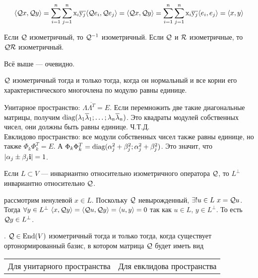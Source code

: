 \documentclass{article}
\begin{document}
\begin{itemize}
\begin{Proof}
            $$
            {\left\langle{{\mathcal{Q}}x},{{\mathcal{Q}} y}\right\rangle}=\sum\limits_{i=1}^n\sum\limits_{j=1}^n\mathrm x_i\overline{\mathrm y_j}{\left\langle{{\mathcal{Q}}e_i},{{\mathcal{Q}} e_j}\right\rangle}={\left\langle{{\mathcal{Q}}x},{{\mathcal{Q}} y}\right\rangle}=\sum\limits_{i=1}^n\sum\limits_{j=1}^n\mathrm x_i\overline{\mathrm y_j}{\left\langle{e_i},{e_j}\right\rangle}={\left\langle{x},{y}\right\rangle}
            $$
        \end{Proof}
        \thm Если ${\mathcal{Q}}$ изометричный, то ${\mathcal{Q}}^{-1}$ изометричный.
        \thm Если ${\mathcal{Q}}$ и ${\mathcal{R}}$ изометричные, то ${\mathcal{Q}}{\mathcal{R}}$ изометричный.
        \begin{Proof}
            Всё выше --- очевидно.
        \end{Proof}
        \thm ${\mathcal{Q}}$ изометричный тогда и только тогда, когда он нормальный и все корни его характеристического многочлена по модулю равны единице.
        \begin{Proof}
            Унитарное пространство: $\Lambda\overline{\Lambda^T}=E$. Если перемножить две такие диагональные матрицы, получим $\operatorname{diag}(\lambda_1\overline\lambda_1;\ldots;\lambda_n\overline\lambda_n)$. Это квадраты модулей собственных чисел, они должны быть равны единице. Ч.Т.Д.\\
            Евклидово пространство: все модули собственных чисел также равны единице, но также $\Phi_k\Phi_k^T=E$. А $\Phi_k\Phi_k^T=\operatorname{diag}(\alpha_j^2+\beta_j^2;\alpha_j^2+\beta_j^2)$. Это значит, что $|\alpha_j\pm\beta_j{\mathbf i}|=1$.
        \end{Proof}
        \thm Если $L\subset V$ --- инвариантно относительно изометричного оператора ${\mathcal{Q}}$, то $L^\perp$ инвариантно относительно ${\mathcal{Q}}$.
        \begin{Proof}
            рассмотрим ненулевой $x\in L$. Поскольку ${\mathcal{Q}}$ невырожденный, $\exists!u\in L~x={\mathcal{Q}} u$. Тогда $\forall y\in L^\perp~{\left\langle{x},{{\mathcal{Q}} y}\right\rangle}={\left\langle{{\mathcal{Q}}u},{{\mathcal{Q}} y}\right\rangle}={\left\langle{u},{y}\right\rangle}=0$ так как $u\in L$, $y\in L^\perp$. То есть ${\mathcal{Q}} y\in L^\perp$.
        \end{Proof}
        \thm {}. ${\mathcal{Q}}\in\operatorname{End}(V)$ изометричный тогда и только тогда, когда существует ортонормированный базис, в котором матрица ${\mathcal{Q}}$ будет иметь вид
        \begin{center}
            \begin{tabular}{|m{}|m{}|}
                \hline
                Для унитарного пространства & Для евклидова пространства\\

\end{tabular}
\end{center}
\end{itemize}
\end{document}
